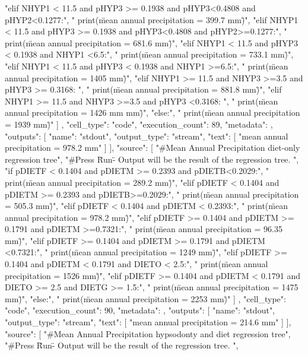 {{    "elif NHYP1 < 11.5 and pHYP3 >= 0.1938 and pHYP3<0.4808 and pHYP2<0.1277:\n",
    "    print(\"mean annual precipitation = 399.7 mm\")\n",
    "elif NHYP1 < 11.5 and pHYP3 >= 0.1938 and pHYP3<0.4808 and pHYP2>=0.1277:\n",
    "    print(\"mean annual precipitation = 681.6 mm\")\n",
    "elif NHYP1 < 11.5 and pHYP3 < 0.1938 and NHYP1 <6.5:\n",
    "    print(\"mean annual precipitation = 733.1 mm\")\n",
    "elif NHYP1 < 11.5 and pHYP3 < 0.1938 and NHYP1 >=6.5:\n",
    "    print(\"mean annual precipitation = 1405 mm\")\n",
    "elif NHYP1 >= 11.5 and NHYP3 >=3.5 and pHYP3 >= 0.3168: \n",
    "    print(\"mean annual precipitation = 881.8 mm\")\n",
    "elif NHYP1 >= 11.5 and NHYP3 >=3.5 and pHYP3 <0.3168: \n",
    "    print(\"mean annual precipitation = 1426 mm mm\")\n",
    "else:\n",
    "    print(\"mean annual precipitation = 1939 mm\")"
   ]
  },
  {
   "cell_type": "code",
   "execution_count": 89,
   "metadata": {},
   "outputs": [
    {
     "name": "stdout",
     "output_type": "stream",
     "text": [
      "mean annual precipitation = 978.2 mm\n"
     ]
    }
   ],
   "source": [
    "#Mean Annual Precipitation diet-only regression tree\n",
    "#Press \"Run\" - Output will be the result of the regression tree. \n",
    "if pDIETF < 0.1404 and pDIETM >= 0.2393 and pDIETB<0.2029:\n",
    "    print(\"mean annual precipitation = 289.2 mm\")\n",
    "elif pDIETF < 0.1404 and pDIETM >= 0.2393 and pDIETB>=0.2029:\n",
    "    print(\"mean annual precipitation = 505.3 mm\")\n",
    "elif pDIETF < 0.1404 and pDIETM < 0.2393:\n",
    "    print(\"mean annual precipitation = 978.2 mm\")\n",
    "elif pDIETF >= 0.1404 and pDIETM >= 0.1791 and pDIETM >=0.7321:\n",
    "    print(\"mean annual precipitation = 96.35 mm\")\n",
    "elif pDIETF >= 0.1404 and pDIETM >= 0.1791 and pDIETM <0.7321:\n",
    "    print(\"mean annual precipitation = 1249 mm\")\n",
    "elif pDIETF >= 0.1404 and pDIETM < 0.1791 and DIETO < 2.5:\n",
    "    print(\"mean annual precipitation = 1526 mm\")\n",
    "elif pDIETF >= 0.1404 and pDIETM < 0.1791 and DIETO >= 2.5 and DIETG >= 1.5:\n",
    "    print(\"mean annual precipitation = 1475 mm\")\n",
    "else:\n",
    "    print(\"mean annual precipitation = 2253 mm\")"
   ]
  },
  {
   "cell_type": "code",
   "execution_count": 90,
   "metadata": {},
   "outputs": [
    {
     "name": "stdout",
     "output_type": "stream",
     "text": [
      "mean annual precipitation = 214.6 mm\n"
     ]
    }
   ],
   "source": [
    "#Mean Annual Precipitation hypsodonty and diet regression tree\n",
    "#Press \"Run\" - Output will be the result of the regression tree. \n",
}}
